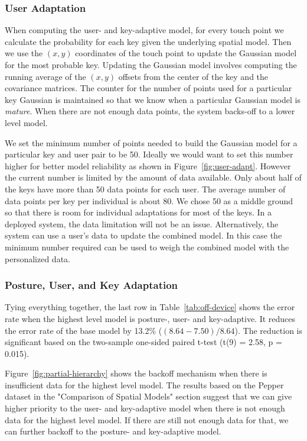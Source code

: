 \documentclass{sigchi}
\begin{document}
\subsubsection{User Adaptation}
When computing the user- and key-adaptive model, for every touch point
we calculate the probability for each key given the underlying spatial model.
Then we use the $(x, y)$ coordinates of the touch point to update the Gaussian model for the most probable key. Updating the Gaussian model involves computing the running average of the $(x, y)$ offsets from the center of the key and the covariance matrices. The counter for the number of points used for a particular key Gaussian is maintained so that we
know when a particular Gaussian model is \textit{mature}. When there are not enough data points, the system backs-off to a lower level model.

We set the minimum number of points needed to build the
Gaussian model for a particular key and user pair to be 50.
Ideally we would want to set this number higher for better model reliability as 
shown in Figure~\ref{fig:user-adapt}. However the current number is limited by 
the amount of data available.  Only about half of the keys
have more than 50 data points for each user. The average number of data 
points per key per individual is about 80. We chose 50 as a middle ground so
that there is room for individual adaptations for most of the keys. In a deployed system, 
the data limitation will not be an issue. Alternatively, the system can use a user's data to 
update the combined model. In this case the minimum 
number required can be used to weigh the combined model with the personalized data.

\subsubsection{Posture, User, and Key Adaptation}
Tying everything together, the last row in Table~\ref{tab:off-device} shows the 
error rate when the highest level model is posture-, user- and key-adaptive.
It reduces the error rate of the base model by 13.2\% ($(8.64 - 7.50) / 8.64$). The reduction is significant based on
the two-sample one-sided paired t-test (t(9) = 2.58, p = 0.015).

Figure~\ref{fig:partial-hierarchy} shows the backoff mechanism when there is
insufficient data for the highest level model. The results based on the Pepper
dataset in the "Comparison of Spatial Models" section suggest that we can give higher priority to the user- and key-adaptive model when there is not enough data for the highest level model. If there are still not enough data for that, we 
can further backoff to the posture- and key-adaptive model. 
\end{document}
